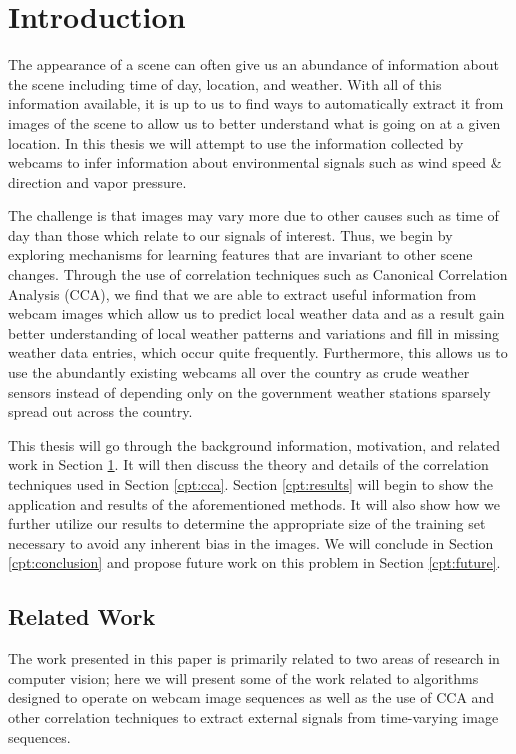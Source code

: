 \chapter{Introduction}
\label{cpt:intro}
The appearance of a scene can often give us an abundance of information about the scene including time of day, location, and weather. With all of this information available, it is up to us to find ways to automatically extract it from images of the scene to allow us to better understand what is going on at a given location. In this thesis we will attempt to use the information collected by webcams to infer information about environmental signals such as wind speed \& direction and vapor pressure. 

The challenge is that images may vary more due to other causes such as time of day than those which relate to our signals of interest. Thus, we begin by exploring mechanisms for learning features that are invariant to other scene changes. Through the use of correlation techniques such as Canonical Correlation Analysis (CCA), we find that we are able to extract useful information from webcam images which allow us to predict local weather data and as a result gain better understanding of local weather patterns and variations and fill in missing weather data entries, which occur quite frequently. Furthermore, this allows us to use the abundantly existing webcams all over the country as crude weather sensors instead of depending only on the government weather stations sparsely spread out across the country. 

This thesis will go through the background information, motivation, and related work in Section \ref{cpt:intro}. It will then discuss the theory and details of the correlation techniques used in Section \ref{cpt:cca}. Section \ref{cpt:results} will begin to show the application and results of the aforementioned methods. It will also show how we further utilize our results to determine the appropriate size of the training set necessary to avoid any inherent bias in the images. We will conclude in Section \ref{cpt:conclusion} and propose future work on this problem in Section \ref{cpt:future}.

\section{Related Work}
The work presented in this paper is primarily related to two areas of research in computer vision; here we will present some of the work related to algorithms designed to operate on webcam image sequences as well as the use of CCA and other correlation techniques to extract external signals from time-varying image sequences.

